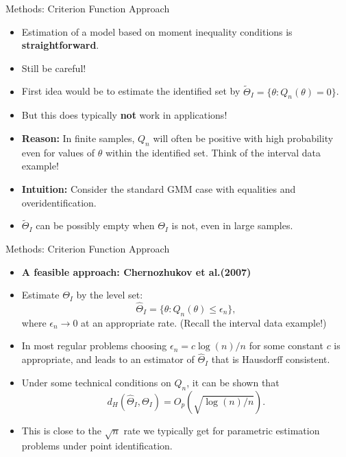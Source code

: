 \documentclass[aspectratio=169]{beamer}  %
\begin{document}
\begin{frame}{Methods: Criterion Function Approach}
    \begin{itemize}
        \item Estimation of a model based on moment inequality conditions is \textbf{straightforward}.
        \item Still be careful!
        \item First idea would be to estimate the identified set by $\tilde{\Theta}_I = \{\theta: Q_n(\theta) = 0\}$.
        \item But this does typically \textbf{not} work in applications!
        \item \textbf{Reason:} In finite samples, $Q_n$ will often be positive with high probability even for values of $\theta$ within the identified set. Think of the interval data example!
        \item \textbf{Intuition:} Consider the standard GMM case with equalities and overidentification.
        \item $\tilde{\Theta}_I$ can be possibly empty when ${\Theta}_I$ is not, even in large samples.
    \end{itemize}
\end{frame}

\begin{frame}{Methods: Criterion Function Approach}
    \begin{itemize}
        \item \textbf{A feasible approach: Chernozhukov et al.(2007)}
        \item Estimate ${\Theta}_I$ by the level set: $$\hat{\Theta}_I = \{\theta: Q_n(\theta) \leq \epsilon_n\},$$ where $\epsilon_n\to 0$ at an appropriate rate. (Recall the interval data example!)
        \item In most regular problems choosing $\epsilon_n=c\log(n)/n$ for some constant $c$ is appropriate, and leads to an estimator of $\hat{\Theta}_I$ that is Hausdorff consistent.
        \item Under some technical conditions on $Q_n$, it can be shown that $$d_H(\hat{\Theta}_I,\Theta_I)=O_p\left(\sqrt{\log(n)/n}\right).$$
        \item This is close to the $\sqrt{n}$ rate we typically get for parametric estimation problems under point identification.
    \end{itemize}
\end{frame}
\end{document}
